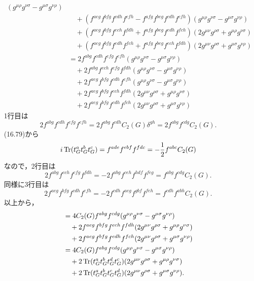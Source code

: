 \begin{align*}
  (g^{\mu\rho} g^{\nu\sigma} - g^{\mu\sigma} g^{\nu\rho})
  \\ &\quad
  + (f^{aeg} f^{bfg} f^{cdh} f^{efh} - f^{afg} f^{beg} f^{cdh} f^{efh})
  (g^{\mu\rho} g^{\nu\sigma} - g^{\mu\sigma} g^{\nu\rho})
  \\ &\quad
  + (f^{aeg} f^{bfg} f^{ech} f^{fdh} + f^{afg} f^{beg} f^{edh} f^{fch})
  (2 g^{\mu\nu} g^{\rho\sigma} + g^{\mu\rho} g^{\nu\sigma})
  \\ &\quad
  + (f^{aeg} f^{bfg} f^{edh} f^{fch} + f^{afg} f^{beg} f^{ech} f^{fdh})
  (2 g^{\mu\nu} g^{\rho\sigma} + g^{\mu\sigma} g^{\nu\rho})
  \\
  & =
  2 f^{abg} f^{cdh} f^{efg} f^{efh} (g^{\mu\rho} g^{\nu\sigma} - g^{\mu\sigma} g^{\nu\rho})
  \\ &\quad
  + 2 f^{abg} f^{ech} f^{efg} f^{fdh} (g^{\mu\rho} g^{\nu\sigma} - g^{\mu\sigma} g^{\nu\rho})
  \\ &\quad
  + 2 f^{aeg} f^{bfg} f^{cdh} f^{efh} (g^{\mu\rho} g^{\nu\sigma} - g^{\mu\sigma} g^{\nu\rho})
  \\ &\quad
  + 2 f^{aeg} f^{bfg} f^{ech} f^{fdh} (2 g^{\mu\nu} g^{\rho\sigma} + g^{\mu\rho} g^{\nu\sigma})
  \\ &\quad
  + 2 f^{aeg} f^{bfg} f^{edh} f^{fch} (2 g^{\mu\nu} g^{\rho\sigma} + g^{\mu\sigma} g^{\nu\rho})
\end{align*}
1行目は
\[
2 f^{abg} f^{cdh} f^{efg} f^{efh} = 2 f^{abg} f^{cdh} C_2(G) \delta^{gh} = 2 f^{abg} f^{cdg} C_2(G) .
\]
(16.79)から
\begin{align}
  i \operatorname{Tr}(t_G^a t_G^b t_G^c) = f^{ade} f^{ebf} f^{fdc} = - \frac{1}{2} f^{abc} C_2(G)
  \label{prob13_6_3trace_adj}
\end{align}
なので，2行目は
\[
2 f^{abg} f^{ech} f^{efg} f^{fdh} = - 2 f^{abg} f^{ceh} f^{hdf} f^{feg} = f^{abg} f^{cdg} C_2(G) .
\]
同様に3行目は
\[
2 f^{aeg} f^{bfg} f^{cdh} f^{efh} = - 2 f^{cdh} f^{aeg} f^{gbf} f^{feh} = f^{cdh} f^{abh} C_2(G) .
\]
以上から，
\begin{align*}
  &= 4 C_2(G) f^{abg} f^{cdg} (g^{\mu\rho} g^{\nu\sigma} - g^{\mu\sigma} g^{\nu\rho})
  \\ &\quad
  + 2 f^{aeg} f^{bfg} f^{ech} f^{fdh} (2 g^{\mu\nu} g^{\rho\sigma} + g^{\mu\rho} g^{\nu\sigma})
  \\ &\quad
  + 2 f^{aeg} f^{bfg} f^{edh} f^{fch} (2 g^{\mu\nu} g^{\rho\sigma} + g^{\mu\sigma} g^{\nu\rho}) \\
  &= 4 C_2(G) f^{abg} f^{cdg} (g^{\mu\rho} g^{\nu\sigma} - g^{\mu\sigma} g^{\nu\rho})
  \\ &\quad
  + 2 \operatorname{Tr}(t_G^a t_G^b t_G^d t_G^c) (2 g^{\mu\nu} g^{\rho\sigma} + g^{\mu\rho} g^{\nu\sigma})
  \\ &\quad
  + 2 \operatorname{Tr}(t_G^a t_G^b t_G^c t_G^d) (2 g^{\mu\nu} g^{\rho\sigma} + g^{\mu\sigma} g^{\nu\rho}) .
\end{align*}
